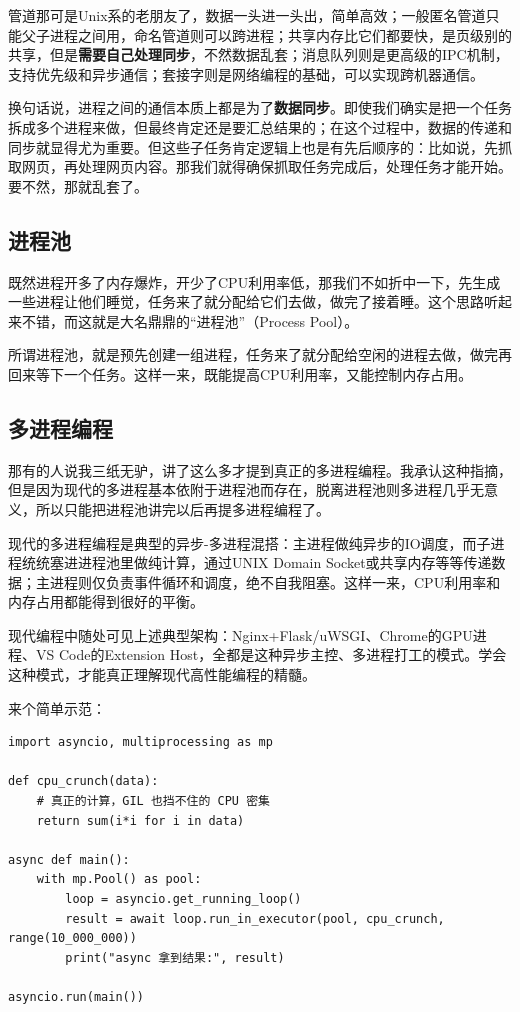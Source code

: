 管道那可是Unix系的老朋友了，数据一头进一头出，简单高效；一般匿名管道只能父子进程之间用，命名管道则可以跨进程；共享内存比它们都要快，是页级别的共享，但是\textbf{需要自己处理同步}，不然数据乱套；消息队列则是更高级的IPC机制，支持优先级和异步通信；套接字则是网络编程的基础，可以实现跨机器通信。

换句话说，进程之间的通信本质上都是为了\textbf{数据同步}。即使我们确实是把一个任务拆成多个进程来做，但最终肯定还是要汇总结果的；在这个过程中，数据的传递和同步就显得尤为重要。但这些子任务肯定逻辑上也是有先后顺序的：比如说，先抓取网页，再处理网页内容。那我们就得确保抓取任务完成后，处理任务才能开始。要不然，那就乱套了。

\subsection{进程池}

既然进程开多了内存爆炸，开少了CPU利用率低，那我们不如折中一下，先生成一些进程让他们睡觉，任务来了就分配给它们去做，做完了接着睡。这个思路听起来不错，而这就是大名鼎鼎的“进程池”（Process Pool）。

所谓进程池，就是预先创建一组进程，任务来了就分配给空闲的进程去做，做完再回来等下一个任务。这样一来，既能提高CPU利用率，又能控制内存占用。

\subsection{多进程编程}

那有的人说我三纸无驴，讲了这么多才提到真正的多进程编程。我承认这种指摘，但是因为现代的多进程基本依附于进程池而存在，脱离进程池则多进程几乎无意义，所以只能把进程池讲完以后再提多进程编程了。

现代的多进程编程是典型的异步-多进程混搭：主进程做纯异步的IO调度，而子进程统统塞进进程池里做纯计算，通过UNIX Domain Socket或共享内存等等传递数据；主进程则仅负责事件循环和调度，绝不自我阻塞。这样一来，CPU利用率和内存占用都能得到很好的平衡。

现代编程中随处可见上述典型架构：Nginx+Flask/uWSGI、Chrome的GPU进程、VS Code的Extension Host，全都是这种异步主控、多进程打工的模式。学会这种模式，才能真正理解现代高性能编程的精髓。

来个简单示范：
\begin{verbatim}
import asyncio, multiprocessing as mp

def cpu_crunch(data):
    # 真正的计算，GIL 也挡不住的 CPU 密集
    return sum(i*i for i in data)

async def main():
    with mp.Pool() as pool:
        loop = asyncio.get_running_loop()
        result = await loop.run_in_executor(pool, cpu_crunch, range(10_000_000))
        print("async 拿到结果:", result)

asyncio.run(main())
\end{verbatim}

